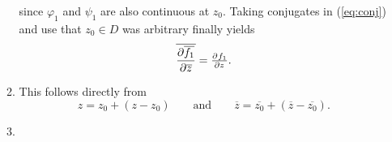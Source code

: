 \begin{enumerate}[label = \textbf{Exercise \arabic*.},wide = 0pt, itemsep=1.5ex]
\begin{enumerate}[label = (\roman*),wide = 0pt, itemsep=1.5ex]
				\noindent since $\varphi_1$ and $\psi_1$ are also continuous at $z_0$. Taking conjugates in (\ref{eq:conj}) and use that $z_0 \in D$ was arbitrary finally yields
				\begin{equation}
					\overline{\frac{\partial\overline{f_1}}{\partial\overline{z}}} = \pd{f_1}{z}.
				\end{equation}

			\item This follows directly from
				\begin{equation}
					z = z_0 + (z - z_0) \qquad \text{and} \qquad \overline{z} = \overline{z_0} + (\overline{z} - \overline{z_0}).
				\end{equation}

			\item
		\end{enumerate}

\end{enumerate}
\printbibliography

